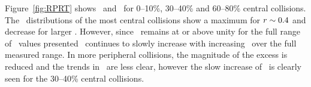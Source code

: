 Figure~\ref{fig:RPRT} shows \RTheta\ and \RP\ for 0--10\%, 30--40\% and 60--80\% central collisions.  The \RTheta\ 
distributions of the most central collisions show a maximum for $\mbox{$r$} \sim 0.4$ and decrease for larger \rvar.
However, since \RTheta\ remains at or above unity for the full range of \rvar\ values presented \RP\ continues
to slowly increase with increasing \rvar\ over the full measured range.  In more peripheral collisions,
the magnitude of the excess is reduced and the trends in \RTheta\ are less clear, however the slow increase
of \RP\ is clearly seen for the 30--40\% central collisions.




\FloatBarrier
